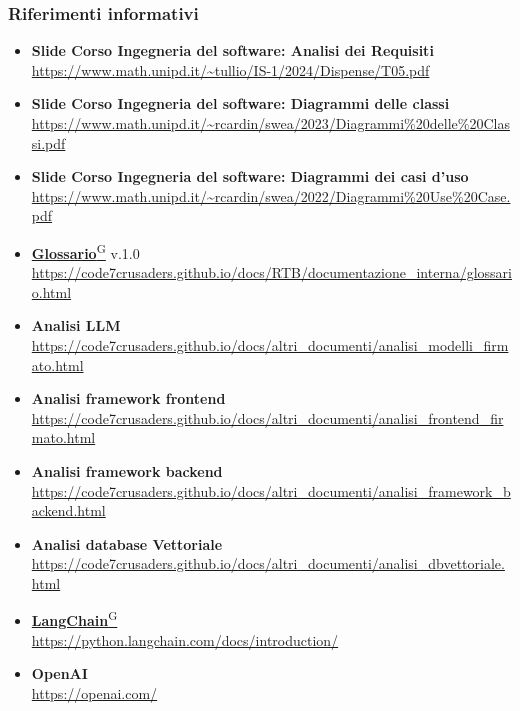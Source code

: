 \subsubsection{Riferimenti informativi}
\begin{itemize}
    \item \textbf{Slide Corso Ingegneria del software: Analisi dei Requisiti} \\ \url{https://www.math.unipd.it/~tullio/IS-1/2024/Dispense/T05.pdf}
    \item \textbf{Slide Corso Ingegneria del software: Diagrammi delle classi} \\ \url{https://www.math.unipd.it/~rcardin/swea/2023/Diagrammi%20delle%20Classi.pdf}
    \item \textbf{Slide Corso Ingegneria del software: Diagrammi dei casi d'uso}\\ \url{https://www.math.unipd.it/~rcardin/swea/2022/Diagrammi%20Use%20Case.pdf}
    \item \href{https://code7crusaders.github.io/docs/PB/documentazione_interna/glossario.html#glossario}{\textbf{Glossario}\textsuperscript{G}} v.1.0 \\ \url{https://code7crusaders.github.io/docs/RTB/documentazione_interna/glossario.html}
    \item \textbf{Analisi LLM} \\ \url{https://code7crusaders.github.io/docs/altri_documenti/analisi_modelli_firmato.html}
    \item \textbf{Analisi framework frontend} \\ \url{https://code7crusaders.github.io/docs/altri_documenti/analisi_frontend_firmato.html}
    \item \textbf{Analisi framework backend} \\ \url{https://code7crusaders.github.io/docs/altri_documenti/analisi_framework_backend.html}
    \item \textbf{Analisi database Vettoriale} \\ \url{https://code7crusaders.github.io/docs/altri_documenti/analisi_dbvettoriale.html}
    \item \href{https://code7crusaders.github.io/docs/PB/documentazione_interna/glossario.html#langchain}{\textbf{LangChain}\textsuperscript{G}} \\ \url{https://python.langchain.com/docs/introduction/}
    \item \textbf{OpenAI} \\ \url{https://openai.com/}

\end{itemize}
